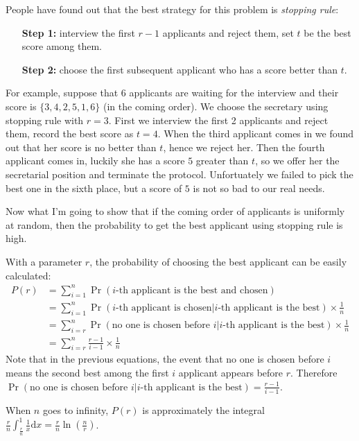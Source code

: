People have found out that the best strategy for this problem is 
\emph{stopping rule}:
\begin{itemize}
    \item[{\bf Step 1:}] interview the first $r - 1$ applicants and 
        reject them, set $t$ be the best score among them.
    \item[{\bf Step 2:}] choose the first subsequent applicant who has
        a score better than $t$.
\end{itemize}

For example, suppose that 6 applicants are waiting for the interview
and their score is $\{3, 4, 2, 5, 1, 6\}$ (in the coming order).
We choose the secretary using stopping rule with $r = 3$. First we
interview the first 2 applicants and reject them, record the best score
as $t = 4$. When the third applicant comes in we found out that her score
is no better than $t$, hence we reject her. Then the fourth applicant comes
in, luckily she has a score $5$ greater than $t$, so we offer her the 
secretarial position and terminate the protocol. Unfortuately we failed to
pick the best one in the sixth place, but a score of $5$ is not so bad to
our real needs.

Now what I'm going to show that if the coming order of applicants is
uniformly at random, then the probability to get the best applicant using
stopping rule is high.

With a parameter $r$, the probability of choosing the best applicant can
be easily calculated:
\begin{align*}
    P(r) &= \sum_{i = 1}^n \Pr(\text{$i$-th applicant is the best and chosen}) \\
         &= \sum_{i = 1}^n \Pr(\text{$i$-th applicant is chosen} | \text{$i$-th applicant is the best}) \times \frac{1}{n} \\
         &= \sum_{i = r}^n \Pr(\text{no one is chosen before $i$}|\text{$i$-th applicant is the best}) \times \frac{1}{n} \\
         &= \sum_{i = r}^n \frac{r - 1}{i - 1} \times \frac{1}{n}
\end{align*}
Note that in the previous equations, the event that no one is chosen 
before $i$ means the second best among the first $i$ applicant 
appears before $r$. Therefore \\  
$\Pr(\text{no one is chosen before $i$}|\text{$i$-th applicant is the best}) = \frac{r - 1}{i - 1}$.

When $n$ goes to infinity, $P(r)$ is approximately the integral
$\frac{r}{n} \int_{\frac{r}{n}}^1 \frac{1}{x} \mathrm{d}x 
= \frac{r}{n} \ln(\frac{n}{r})$.

